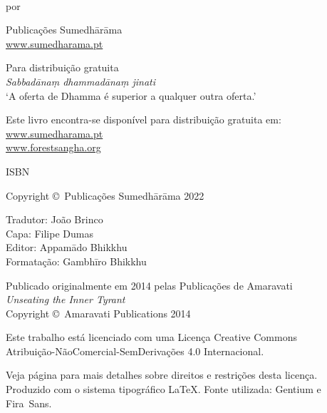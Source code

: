 \cleartoverso
\thispagestyle{empty}

\vspace*{-2.5\baselineskip}
\enlargethispage{2.5\baselineskip}

{\fontsize{7}{9}\selectfont
\centering
\setlength{\parindent}{0pt}%
\setlength{\parskip}{6pt}%

\thetitle\\
por \theauthor

Publicações Sumedhārāma\\
\href{https://sumedharama.pt}{www.sumedharama.pt}

Para distribuição gratuita\\
\textit{Sabbadānaṃ dhammadānaṃ jinati}\\
‘A oferta de Dhamma é superior a qualquer outra oferta.’

Este livro encontra-se disponível para distribuição gratuita em:\\
\href{https://sumedharama.pt}{www.sumedharama.pt}\\
\href{https://forestsangha.org}{www.forestsangha.org}

ISBN \theISBN

Copyright \copyright\ Publicações Sumedhārāma 2022

Tradutor: João Brinco\\
Capa: Filipe Dumas\\
Editor: Appamādo Bhikkhu\\
Formatação: Gambhīro Bhikkhu

Publicado originalmente em 2014 pelas Publicações de Amaravati\\
\emph{Unseating the Inner Tyrant}\\
Copyright \copyright\ Amaravati Publications 2014

\vfill

Este trabalho está licenciado com uma Licença Creative Commons\\
Atribuição-NãoComercial-SemDerivações 4.0 Internacional.

Veja página \pageref{copyright-details} para mais detalhes sobre direitos e restrições desta licença.\\
Produzido com o sistema tipográfico \LaTeX. Fonte utilizada: Gentium e Fira~Sans.

\theEditionInfo

}
